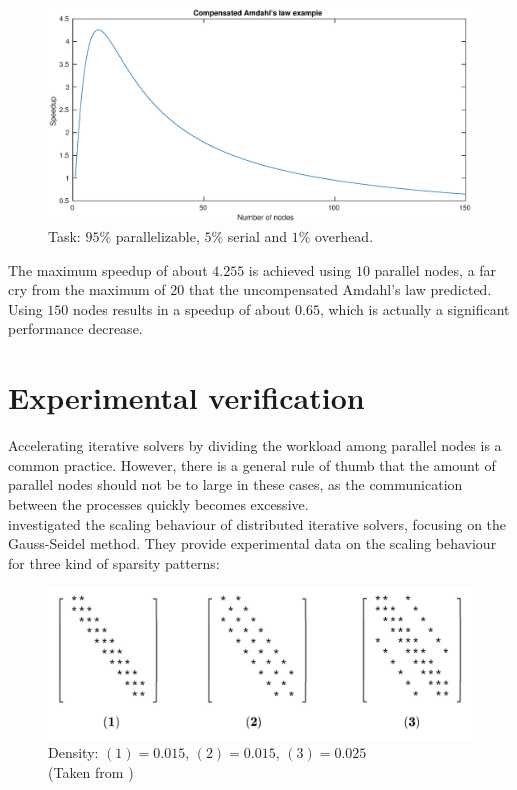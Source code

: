 \begin{figure}[h!]
    \includegraphics[width=\linewidth]{figures/Compensated_amdahl.eps}
    \centering
    \caption{Task: $95 \%$ parallelizable, $5 \%$ serial and $1 \%$ overhead.}
    \label{com. amd. ex.}
\end{figure}

The maximum speedup of about $4.255$ is achieved using $10$ parallel nodes, a far cry from the maximum of $20$ that the uncompensated Amdahl's law predicted. Using $150$ nodes results in a speedup of about $0.65$, which is actually a significant performance decrease.

\newpage

\section{Experimental verification}

\hspace{4mm} Accelerating iterative solvers by dividing the workload among parallel nodes is a common practice. However, there is a general rule of thumb that the amount of parallel nodes should not be to large in these cases, as the communication between the processes quickly becomes excessive.\\

\citeauthor{dist_it_solv} investigated the scaling behaviour of distributed iterative solvers, focusing on the Gauss-Seidel method\autocite[]{dist_it_solv}. They provide experimental data on the scaling behaviour for three kind of sparsity patterns:

\begin{figure}[h!]
    \includegraphics[width=0.6\linewidth]{figures/Amd_sparse.png}
    \centering
    \caption{Density: $(1) = 0.015$, $(2) = 0.015$, $(3) = 0.025$ \\ (Taken from \citeauthor{dist_it_solv})}
    \label{com. amd. sp.}
\end{figure}

